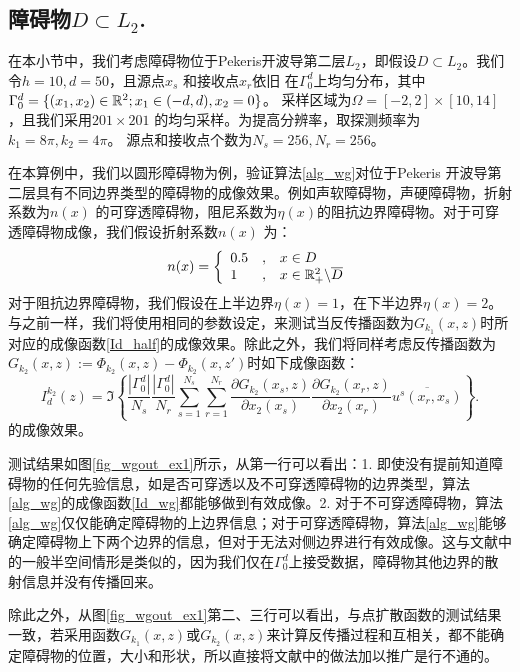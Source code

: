 \subsection{障碍物$D\subset L_2$.}
在本小节中，我们考虑障碍物位于Pekeris开波导第二层$L_2$，即假设$D\subset L_2$。我们令$h=10,d=50$，且源点$x_s$ 和接收点$x_r$依旧 在$\Gamma_0^d$上均匀分布，其中$\Gamma_0^d=\{(x_1,x_2)\in\mathbb{R}^2;x_1\in(-d,d),x_2=0\}$。 采样区域为$\Omega=[-2,2]\times[10,14]$，且我们采用$201\times201$ 的均匀采样。为提高分辨率，取探测频率为$k_1=8\pi,k_2=4\pi$。 源点和接收点个数为$N_s=256,N_r=256$。
\begin{example}[不同边界类型]\label{wgout_ex1}
在本算例中，我们以圆形障碍物为例，验证算法\ref{alg_wg}对位于Pekeris 开波导第二层具有不同边界类型的障碍物的成像效果。例如声软障碍物，声硬障碍物，折射系数为$n(x)$ 的可穿透障碍物，阻尼系数为$\eta(x)$的阻抗边界障碍物。对于可穿透障碍物成像，我们假设折射系数$n(x)$ 为：
\begin{eqnarray*}
n(x)=\left\{
\begin{array}{lll}
  0.5&,&x\in D\\
  1&,&x\in\mathbb{R}_+^2\backslash\overline D
\end{array}
\right.
\end{eqnarray*}
对于阻抗边界障碍物，我们假设在上半边界$\eta(x)=1$，在下半边界$\eta(x)=2$。与之前一样，我们将使用相同的参数设定，来测试当反传播函数为$G_{k_1}(x,z)$时所对应的成像函数\eqref{Id_half}的成像效果。除此之外，我们将同样考虑反传播函数为$G_{k_2}(x,z):=\Phi_{k_2}(x,z)-\Phi_{k_2}(x,z')$时如下成像函数：
\begin{equation}\label{Id_half2}
I_d^{k_2}(z)=\Im\left\{\frac{|\Gamma_0^d|}{N_s}\frac{|\Gamma_0^d|}{N_r}\sum\limits_{s=1}^{N_s}\sum\limits_{r=1}^{N_r}\frac{\partial G_{k_2}(x_s,z)}{\partial x_2(x_s)}\frac{\partial G_{k_2}(x_r,z)}{\partial x_2(x_r)}\overline{u^s(x_r,x_s)}
\right\}.
\end{equation}
的成像效果。

测试结果如图\ref{fig_wgout_ex1}所示，从第一行可以看出：1. 即使没有提前知道障碍物的任何先验信息，如是否可穿透以及不可穿透障碍物的边界类型，算法\ref{alg_wg}的成像函数\eqref{Id_wg}都能够做到有效成像。2. 对于不可穿透障碍物，算法\ref{alg_wg}仅仅能确定障碍物的上边界信息；对于可穿透障碍物，算法\ref{alg_wg}能够确定障碍物上下两个边界的信息，但对于无法对侧边界进行有效成像。这与文献\cite{ch_ha}中的一般半空间情形是类似的，因为我们仅在$\Gamma_0^d$上接受数据，障碍物其他边界的散射信息并没有传播回来。

除此之外，从图\ref{fig_wgout_ex1}第二、三行可以看出，与点扩散函数的测试结果一致，若采用函数$G_{k_1}(x,z)$或$G_{k_2}(x,z)$来计算反传播过程和互相关，都不能确定障碍物的位置，大小和形状，所以直接将文献\cite{ch_ha,ch_cw}中的做法加以推广是行不通的。
\end{example}
